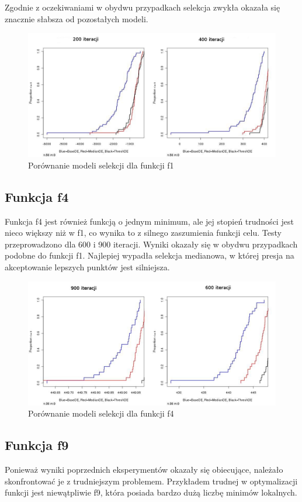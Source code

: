 \documentclass[11pt]{article}
\begin{document}
Zgodnie z oczekiwaniami w obydwu przypadkach selekcja zwykła okazała się znacznie słabsza od pozostałych modeli.

\begin{figure}[ht]
\centering
\includegraphics[width=140mm]{cec2005_1.jpg}
\caption{Porównanie modeli selekcji dla funkcji f1}
\label{overflow}
\end{figure}

\subsection{Funkcja f4}
Funkcja f4 jest również funkcją o jednym minimum, ale jej stopień trudności jest nieco większy niż w f1, co wynika to z silnego zaszumienia funkcji celu.
Testy przeprowadzono dla 600 i 900 iteracji.
Wyniki okazały się w obydwu przypadkach podobne do funkcji f1.
Najlepiej wypadła selekcja medianowa, w której presja na akceptowanie lepszych punktów jest silniejsza.

\begin{figure}[ht]
\centering
\includegraphics[width=140mm]{cec2005_4.jpg}
\caption{Porównanie modeli selekcji dla funkcji f4}
\label{overflow}
\end{figure}

\subsection{Funkcja f9}
Ponieważ wyniki poprzednich eksperymentów okazały się obiecujące, należało skonfrontować je z trudniejszym problemem.
Przykładem trudnej w optymalizacji funkcji jest niewątpliwie f9, która posiada bardzo dużą liczbę minimów lokalnych.
\end{document}
